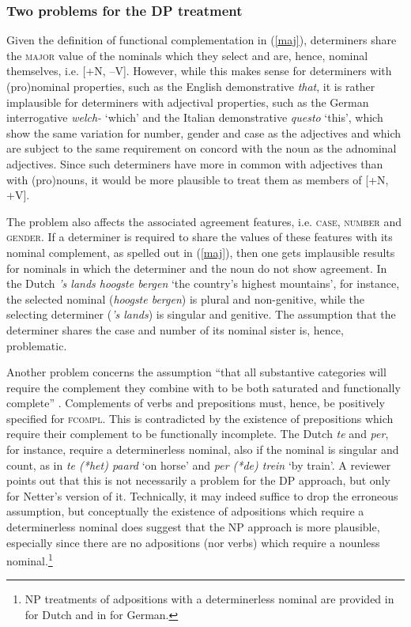 \documentclass[output=paper
	        ,collection
	        ,collectionchapter
 	        ,biblatex
                ,babelshorthands
                ,newtxmath
                ,draftmode
                ,colorlinks, citecolor=brown
]{langscibook}
\begin{document}
\subsubsection{Two problems for the DP treatment}  
\label{prob}


Given the definition of functional complementation in (\ref{maj}), 
determiners share the \textsc{major} value of the nominals which they select
and are, hence, nominal themselves, i.e. [+N, --V].
However, while this makes sense for determiners with (pro)nominal properties,
such as the English demonstrative \emph{that}, 
it is rather implausible for determiners with adjectival properties,
such as the German interrogative \emph{welch-} `which' and 
the Italian demonstrative \emph{questo} `this', which show the same variation for 
number, gender and case as the adjectives and which are subject to 
the same requirement on concord with the noun as the adnominal adjectives. 
Since such determiners have more in common with adjectives than with (pro)nouns,  
it would be more plausible to treat them as members of [+N, +V].  

The problem also affects the associated agreement features, i.e. \textsc{case}, 
\textsc{number} and \textsc{gender}. If a determiner 
is required to share the values of these features with its nominal complement,
as spelled out in (\ref{maj}), then one gets implausible results for nominals in 
which the determiner and the noun do not show agreement.    
In the Dutch \emph{'s lands hoogste bergen} `the country's highest mountains', 
for instance, the selected nominal (\emph{hoogste bergen}) is plural and non-genitive, 
while the selecting determiner (\emph{'s lands}) is singular and genitive.  
The assumption that the determiner shares the case and number of its nominal sister 
is, hence, problematic.

Another problem concerns the assumption ``that all substantive categories will 
require the complement they combine with to be both saturated and functionally complete''
\citep[311]{Netter94}. Complements of verbs and prepositions must, hence, be positively 
specified for \textsc{fcompl}. This is contradicted by the existence of
prepositions which require their complement to be functionally incomplete. 
The Dutch \emph{te} and \emph{per}, for instance, require a determinerless nominal,
also if the nominal is singular and count, as in \emph{te (*het) paard} `on horse' 
and \emph{per (*de) trein} `by train'. A reviewer points out that this is 
not necessarily a problem for the DP approach, but only for Netter's version of it. 
Technically, it may indeed suffice to drop the erroneous assumption, but 
conceptually the existence of adpositions which require a determinerless nominal 
does suggest that the NP approach is more plausible, especially since 
there are no adpositions (nor verbs) which require a nounless nominal.\footnote{NP 
treatments of adpositions with a determinerless nominal are provided in 
\citet{VanEynde04} for Dutch and in \citet{Kiss2008a-u} for German.}    
\end{document}
